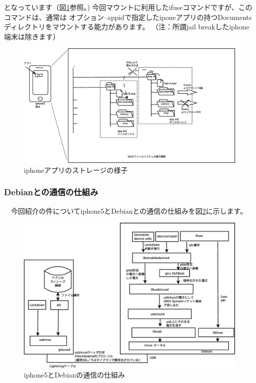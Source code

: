 \documentclass[mingoth,a4paper]{jsarticle}
\begin{document}
となっています（図\ref{fig:iphone-app-fs-overview}参照。) 今回マウントに利用したifuseコマンドですが、このコマンドは、通常は
オプション--appidで指定したiponeアプリの持つDocumentsディレクトリをマウントする能力があります。
（注：所謂jail breakしたiphone端末は除きます）

\begin{figure}[H]
\begin{center}
 \includegraphics[width=0.8\hsize]{image201403/iphone-app-fs-overview.eps}
 \caption{iphoneアプリのストレージの様子}\label{fig:iphone-app-fs-overview}
\end{center}
\end{figure}

\subsubsection{Debianとの通信の仕組み}

　今回紹介の件についてiphone5とDebianとの通信の仕組みを図\ref{fig:iphone-communication-diagram}に示します。

\begin{figure}[H]
\begin{center}
 \includegraphics[width=0.8\hsize]{image201403/iphone-communication-diagram.eps}
 \caption{iphone5とDebianの通信の仕組み}\label{fig:iphone-communication-diagram}
\end{center}
\end{figure}
\end{document}
